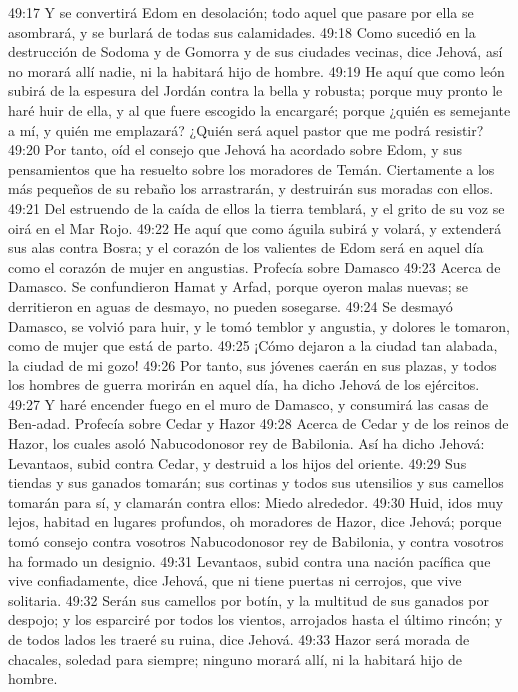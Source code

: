49:17 Y se convertirá Edom en desolación; todo aquel que pasare por ella se asombrará, y se burlará de todas sus calamidades.  
49:18 Como sucedió en la destrucción de Sodoma y de Gomorra y de sus ciudades vecinas, dice Jehová, así no morará allí nadie, ni la habitará hijo de hombre.  
49:19 He aquí que como león subirá de la espesura del Jordán contra la bella y robusta; porque muy pronto le haré huir de ella, y al que fuere escogido la encargaré; porque ¿quién es semejante a mí, y quién me emplazará? ¿Quién será aquel pastor que me podrá resistir?  
49:20 Por tanto, oíd el consejo que Jehová ha acordado sobre Edom, y sus pensamientos que ha resuelto sobre los moradores de Temán. Ciertamente a los más pequeños de su rebaño los arrastrarán, y destruirán sus moradas con ellos.  
49:21 Del estruendo de la caída de ellos la tierra temblará, y el grito de su voz se oirá en el Mar Rojo.  
49:22 He aquí que como águila subirá y volará, y extenderá sus alas contra Bosra; y el corazón de los valientes de Edom será en aquel día como el corazón de mujer en angustias. 
Profecía sobre Damasco  
49:23 Acerca de Damasco. Se confundieron Hamat y Arfad, porque oyeron malas nuevas; se derritieron en aguas de desmayo, no pueden sosegarse.  
49:24 Se desmayó Damasco, se volvió para huir, y le tomó temblor y angustia, y dolores le tomaron, como de mujer que está de parto.  
49:25 ¡Cómo dejaron a la ciudad tan alabada, la ciudad de mi gozo!  
49:26 Por tanto, sus jóvenes caerán en sus plazas, y todos los hombres de guerra morirán en aquel día, ha dicho Jehová de los ejércitos.  
49:27 Y haré encender fuego en el muro de Damasco, y consumirá las casas de Ben-adad.  
Profecía sobre Cedar y Hazor  
49:28 Acerca de Cedar y de los reinos de Hazor, los cuales asoló Nabucodonosor rey de Babilonia. Así ha dicho Jehová: Levantaos, subid contra Cedar, y destruid a los hijos del oriente.  
49:29 Sus tiendas y sus ganados tomarán; sus cortinas y todos sus utensilios y sus camellos tomarán para sí, y clamarán contra ellos: Miedo alrededor.  
49:30 Huid, idos muy lejos, habitad en lugares profundos, oh moradores de Hazor, dice Jehová; porque tomó consejo contra vosotros Nabucodonosor rey de Babilonia, y contra vosotros ha formado un designio.  
49:31 Levantaos, subid contra una nación pacífica que vive confiadamente, dice Jehová, que ni tiene puertas ni cerrojos, que vive solitaria.  
49:32 Serán sus camellos por botín, y la multitud de sus ganados por despojo; y los esparciré por todos los vientos, arrojados hasta el último rincón; y de todos lados les traeré su ruina, dice Jehová.  
49:33 Hazor será morada de chacales, soledad para siempre; ninguno morará allí, ni la habitará hijo de hombre.  
